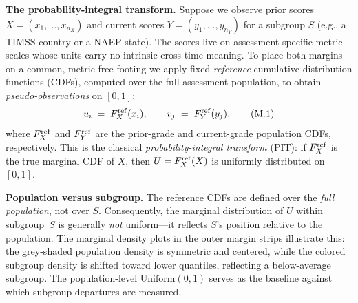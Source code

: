 \documentclass[10pt]{article}
\begin{document}
\noindent
\begin{minipage}[t]{7.8in}
  \vspace{0.1in}
  \hspace{0.2in}%
  \begin{minipage}{7.4in}
    \small\raggedright\color{bodyGrey}

    \textbf{The probability-integral transform.}\enspace
    Suppose we observe prior scores $X = (x_1,\dots,x_{n_X})$ and current scores
    $Y = (y_1,\dots,y_{n_Y})$ for a subgroup $S$ (e.g., a TIMSS country or a
    NAEP state). The scores live on assessment-specific metric scales whose
    units carry no intrinsic cross-time meaning. To place both margins on a
    common, metric-free footing we apply fixed \emph{reference} cumulative
    distribution functions (CDFs), computed over the full assessment population,
    to obtain \emph{pseudo-observations} on $[0,1]$:
    \begin{equation}
      u_i \;=\; F_X^{\mathrm{ref}}(x_i),
      \qquad
      v_j \;=\; F_Y^{\mathrm{ref}}(y_j),
      \tag{M.1}
    \end{equation}
    where $F_X^{\mathrm{ref}}$ and $F_Y^{\mathrm{ref}}$ are the prior-grade and current-grade population CDFs,
    respectively. This is the classical \emph{probability-integral transform} (PIT):
    if $F_X^{\mathrm{ref}}$ is the true marginal CDF of $X$, then $U = F_X^{\mathrm{ref}}(X)$ is uniformly
    distributed on $[0,1]$.

    \vspace{6pt}
    \textbf{Population versus subgroup.}\enspace
    The reference CDFs are defined over the \emph{full population}, not over $S$.
    Consequently, the marginal distribution of $U$ within subgroup~$S$ is
    generally \emph{not} uniform---it reflects $S$'s position relative to the
    population. The marginal density plots in the outer margin strips illustrate
    this: the grey-shaded population density is symmetric and centered, while the
    colored subgroup density is shifted toward lower quantiles, reflecting a
    below-average subgroup. The population-level $\mathrm{Uniform}(0,1)$
    serves as the baseline against which subgroup departures are measured.


\end{minipage}
\end{minipage}
\end{document}
